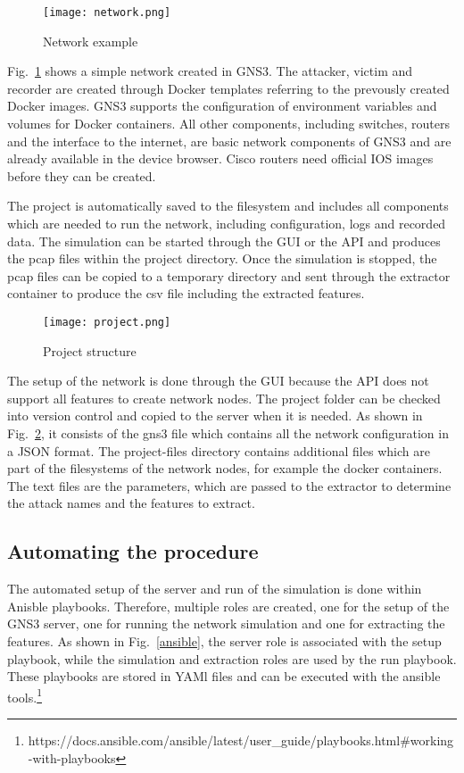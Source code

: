 \documentclass[conference]{IEEEtran}
\begin{document}
\begin{figure}[htbp]
\centerline{\texttt{[image: network.png]}}
\caption{Network example}
\label{network}
\end{figure}

Fig.~\ref{network} shows a simple network created in GNS3. The attacker, victim and recorder are created through Docker templates referring to the prevously created Docker images. GNS3 supports the configuration of environment variables and volumes for Docker containers. All other components, including switches, routers and the interface to the internet, are basic network components of GNS3 and are already available in the device browser. Cisco routers need official IOS images before they can be created.

The project is automatically saved to the filesystem and includes all components which are needed to run the network, including configuration, logs and recorded data. The simulation can be started through the GUI or the API and produces the pcap files within the project directory. Once the simulation is stopped, the pcap files can be copied to a temporary directory and sent through the extractor container to produce the csv file including the extracted features.

\begin{figure}[htbp]
\centerline{\texttt{[image: project.png]}}
\caption{Project structure}
\label{project}
\end{figure}

The setup of the network is done through the GUI because the API does not support all features to create network nodes. The project folder can be checked into version control and copied to the server when it is needed. As shown in Fig.~\ref{project}, it consists of the gns3 file which contains all the network configuration in a JSON format. The project-files directory contains additional files which are part of the filesystems of the network nodes, for example the docker containers. The text files are the parameters, which are passed to the extractor to determine the attack names and the features to extract.

\subsection{Automating the procedure}
The automated setup of the server and run of the simulation is done within Anisble playbooks. Therefore, multiple roles are created, one for the setup of the GNS3 server, one for running the network simulation and one for extracting the features. As shown in Fig.~\ref{ansible}, the server role is associated with the setup playbook, while the simulation and extraction roles are used by the run playbook. These playbooks are stored in YAMl files and can be executed with the ansible tools.\footnote{https://docs.ansible.com/ansible/latest/user\_guide/playbooks.html\#working-with-playbooks}  
\end{document}
